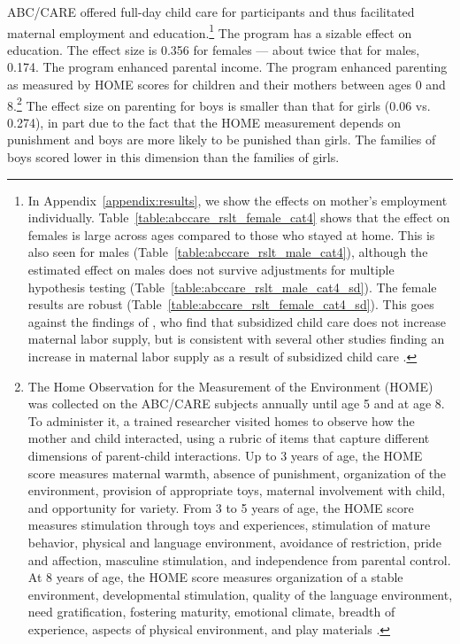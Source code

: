ABC/CARE offered full-day child care for participants and thus facilitated maternal employment and education.\footnote{In Appendix~\ref{appendix:results}, we show the effects on mother's employment individually. Table~\ref{table:abccare_rslt_female_cat4} shows that the effect on females is large across ages compared to those who stayed at home. This is also seen for males (Table~\ref{table:abccare_rslt_male_cat4}), although the estimated effect on males does not survive adjustments for multiple hypothesis testing (Table~\ref{table:abccare_rslt_male_cat4_sd}). The female results are robust (Table~\ref{table:abccare_rslt_female_cat4_sd}). This goes against the findings of \citet{Havnes_Mogstad_2011_JPE}, who find that subsidized child care does not increase maternal labor supply, but is consistent with several other studies finding an increase in maternal labor supply as a result of subsidized child care \citep{Bauernschuster_Schlotter_2015_JPE,Bettendorf_etal_2015_LE,Geyer_etal_2015_LE,Brilli_etal_2016_REH}.} The program has a sizable effect on education. The effect size is 0.356 for females --- about twice that for males, 0.174. The program enhanced parental income. The program enhanced parenting as measured by HOME scores for children and their mothers between ages 0 and 8.\footnote{The Home Observation for the Measurement of the Environment (HOME) was collected on the ABC/CARE subjects annually until age 5 and at age 8. To administer it, a trained researcher visited homes to observe how the mother and child interacted, using a rubric of items that capture different dimensions of parent-child interactions. Up to 3 years of age, the HOME score measures maternal warmth, absence of punishment, organization of the environment, provision of appropriate toys, maternal involvement with child, and opportunity for variety. From 3 to 5 years of age, the HOME score measures stimulation through toys and experiences, stimulation of mature behavior, physical and language environment, avoidance of restriction, pride and affection, masculine stimulation, and independence from parental control. At 8 years of age, the HOME score measures organization of a stable environment, developmental stimulation, quality of the language environment, need gratification, fostering maturity, emotional climate, breadth of experience, aspects of physical environment, and play materials \citep{Bradley-Caldwell_1977_AJMD}.} The effect size on parenting for boys is smaller than that for girls (0.06 vs. 0.274), in part due to the fact that the HOME measurement depends on punishment and boys are more likely to be punished than girls. The families of boys scored lower in this dimension than the families of girls.


